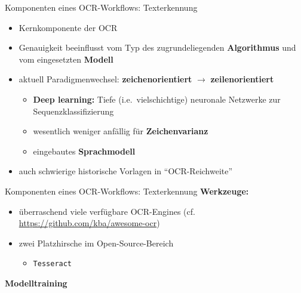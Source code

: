 \documentclass{bbawslides}
\begin{document}
\begin{bbawslide}{Komponenten eines OCR-Workflows: Texterkennung}
  \vspace*{7mm}%
  \centerslidestrue%
  \begin{itemize}
    \item Kernkomponente der OCR
    \item Genauigkeit beeinflusst vom Typ des zugrundeliegenden \textbf{Algorithmus} und vom eingesetzten \textbf{Modell}
    \item aktuell Paradigmenwechsel: \textbf{zeichenorientiert} $\rightarrow$ \textbf{zeilenorientiert}
    \begin{itemize} \small
      \item \textbf{Deep learning:} Tiefe (i.e.~vielschichtige) neuronale Netzwerke zur Sequenzklassifizierung 
      \item wesentlich weniger anfällig für \textbf{Zeichenvarianz}
      \item eingebautes \textbf{Sprachmodell}
    \end{itemize}
    \item auch schwierige historische Vorlagen in \enquote{OCR-Reichweite} 
  \end{itemize}
\end{bbawslide}

\begin{bbawslide}{Komponenten eines OCR-Workflows: Texterkennung}
  \vspace*{7mm}%
  \centerslidestrue%
  \textbf{Werkzeuge:}
  \begin{itemize}
    \item überraschend viele verfügbare OCR-Engines (cf. \url{https://github.com/kba/awesome-ocr})
    \item zwei Platzhirsche im Open-Source-Bereich
    \begin{itemize}
      \item \texttt{Tesseract}
    \end{itemize}
  \end{itemize}
\end{bbawslide}

\begin{bbawpart}{\Large\bf Modelltraining}
\end{bbawpart}
\end{document}

